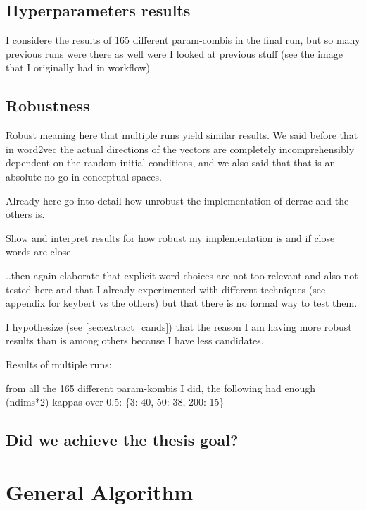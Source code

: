 \subsection{Hyperparameters results}

I considere the results of 165 different param-combis in the final run, but so many previous runs were there as well were I looked at previous stuff (see the image that I originally had in workflow)


\subsection{Robustness}

Robust meaning here that multiple runs yield similar results. We said before that in word2vec the actual directions of the vectors are completely incomprehensibly dependent on the random initial conditions, and we also said that that is an absolute no-go in conceptual spaces.

Already here go into detail how unrobust the implementation of derrac and the others is. 

Show and interpret results for how robust my implementation is and if close words are close

..then again elaborate that explicit word choices are not too relevant and also not tested here and that I already experimented with different techniques (see appendix for keybert vs the others) but that there is no formal way to test them.

I hypothesize (see \autoref{sec:extract_cands}) that the reason I am having more robust results than \cite{Derrac2015} is among others because I have less candidates.

Results of multiple runs: 

from all the 165 different param-kombis I did, the following had enough (ndims*2) kappas-over-0.5:
\{3: 40, 50: 38, 200: 15\}





\subsection{Did we achieve the thesis goal?}


\section{General Algorithm}

